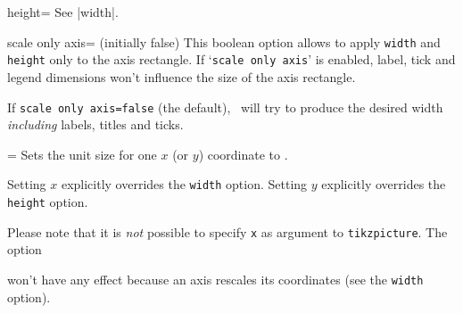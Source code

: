 \begin{pgfplotskey}{height=}
	See |width|.
\end{pgfplotskey}

\begin{pgfplotskey}{scale only axis= (initially false)}
This boolean option allows to apply \texttt{width} and \texttt{height} only to the axis rectangle. If `\texttt{scale only axis}' is enabled, label, tick and legend dimensions won't influence the size of the axis rectangle.

If \texttt{scale only axis=false} (the default), \PGFPlots\ will try to produce the desired width \emph{including} labels, titles and ticks.
\end{pgfplotskey}

\begin{pgfplotsxykey}{\x=}
Sets the unit size for one $x$ (or $y$) coordinate to .

	Setting $x$ explicitly overrides the \lstinline!width! option. Setting $y$ explicitly overrides the \lstinline!height! option.

	Please note that it is \emph{not} possible to specify \lstinline!x! as argument to \lstinline!tikzpicture!. The option 
	\begin{codeexample}
	\end{codeexample}
	won't have any effect because an axis rescales its coordinates (see the \lstinline!width! option).
\end{pgfplotsxykey}

